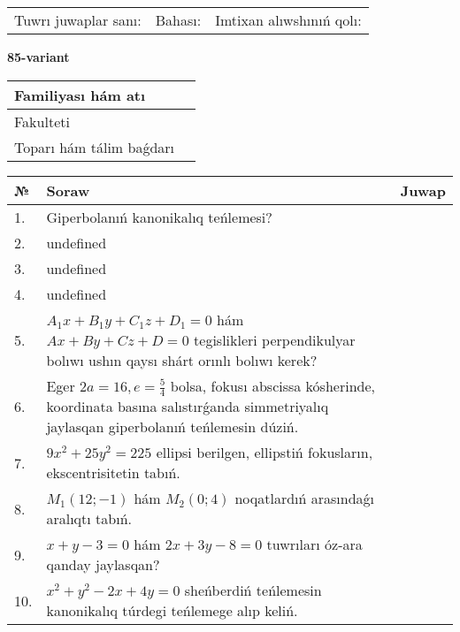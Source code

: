 \documentclass{article}
\begin{document}
\vspace{0.7cm}

\begin{tabular}{lll}
Tuwrı juwaplar sanı: \underline{\hspace{1cm}} & 
Bahası: \underline{\hspace{1cm}} & 
Imtixan alıwshınıń qolı: \underline{\hspace{2cm}} \\
\end{tabular}

\egroup

\newpage


\textbf{85-variant}\\

\bgroup
\def\arraystretch{1.6} %

\begin{tabular}{|m{5.7cm}|m{9.5cm}|}
\hline
Familiyası hám atı & \\
\hline
Fakulteti  & \\
\hline
Toparı hám tálim baǵdarı  & \\
\hline
\end{tabular}

\vspace{0.7cm}

\begin{tabular}{|m{0.7cm}|m{10cm}|m{4cm}|}
\hline
№ & Soraw & Juwap \\
\hline
1. & Giperbolanıń kanonikalıq teńlemesi? &  \\
\hline
2. & undefined &  \\
\hline
3. & undefined &  \\
\hline
4. & undefined &  \\
\hline
5. & \(A_{1}x + B_{1}y + C_{1}z + D_{1} = 0\) hám \(Ax + By + Cz + D = 0\) tegislikleri perpendikulyar bolıwı ushın qaysı shárt orınlı bolıwı kerek? &  \\
\hline
6. & Eger \(2 a = 16, e = \frac{5}{4}\) bolsa, fokusı abscissa kósherinde, koordinata basına salıstırǵanda simmetriyalıq jaylasqan giperbolanıń teńlemesin dúziń. &  \\
\hline
7. & \(9 x^{2} + 25 y^{2} = 225\) ellipsi berilgen, ellipstiń fokusların, ekscentrisitetin tabıń. &  \\
\hline
8. & \(M_{1} (12; - 1)\) hám \(M_{2} (0;4)\) noqatlardıń arasındaǵı aralıqtı tabıń. &  \\
\hline
9. & \(x + y - 3 = 0\) hám \(2 x + 3 y - 8 = 0\) tuwrıları óz-ara qanday jaylasqan? &  \\
\hline
10. & \(x^{2} + y^{2} - 2 x + 4 y = 0\) sheńberdiń teńlemesin kanonikalıq túrdegi teńlemege alıp keliń. & \\
\hline
\end{tabular}
\end{document}
